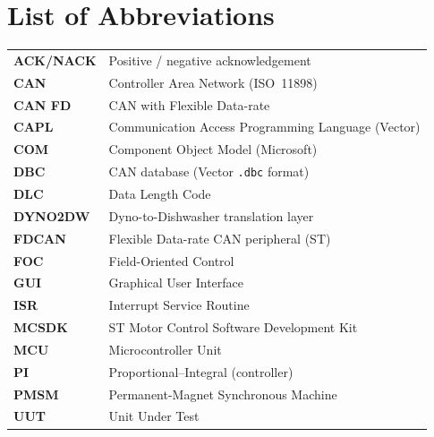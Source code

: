 \documentclass[11pt,a4paper,oneside,openany]{book}
\theoremstyle{definition}
\begin{document}
\chapter*{List of Abbreviations}
\begin{tabularx}{\textwidth}{@{}lX@{}}
\toprule
\textbf{ACK/NACK} & Positive / negative acknowledgement \\
\textbf{CAN}      & Controller Area Network (ISO~11898) \\
\textbf{CAN FD}   & CAN with Flexible Data-rate \\
\textbf{CAPL}     & Communication Access Programming Language (Vector) \\
\textbf{COM}      & Component Object Model (Microsoft) \\
\textbf{DBC}      & CAN database (Vector \texttt{.dbc} format) \\
\textbf{DLC}      & Data Length Code \\
\textbf{DYNO2DW}  & Dyno-to-Dishwasher translation layer \\
\textbf{FDCAN}    & Flexible Data-rate CAN peripheral (ST) \\
\textbf{FOC}      & Field-Oriented Control \\
\textbf{GUI}      & Graphical User Interface \\
\textbf{ISR}      & Interrupt Service Routine \\
\textbf{MCSDK}    & ST Motor Control Software Development Kit \\
\textbf{MCU}      & Microcontroller Unit \\
\textbf{PI}       & Proportional--Integral (controller) \\
\textbf{PMSM}     & Permanent-Magnet Synchronous Machine \\
\textbf{UUT}      & Unit Under Test \\
\bottomrule
\end{tabularx}

\mainmatter
\pagestyle{fancy}










\appendix


\backmatter

\end{document}
